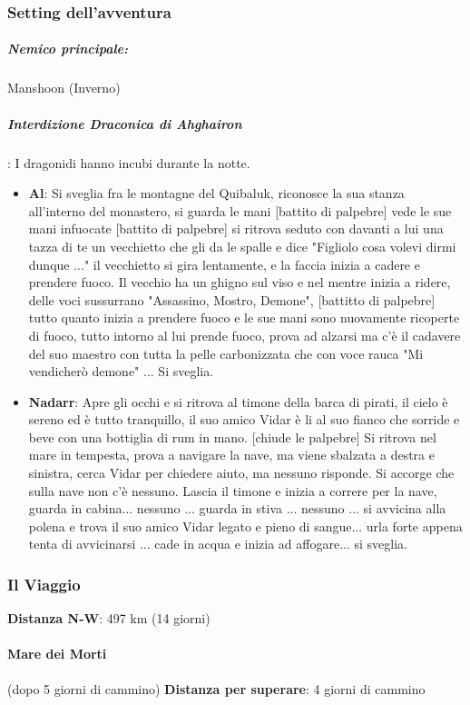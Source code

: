 \documentclass{article}
\begin{document}
\subsubsection{Setting dell'avventura}
\subparagraph{Nemico principale: } Manshoon (Inverno)
\subparagraph{Interdizione Draconica di Ahghairon}: I dragonidi hanno incubi durante la notte. 
\begin{itemize}
    \item \textbf{Al}: Si sveglia fra le montagne del Quibaluk, riconosce la sua stanza all'interno del monastero, si guarda le mani [battito di palpebre] vede le sue mani infuocate [battito di palpebre] si ritrova seduto con davanti a lui una tazza di te un vecchietto che gli da le spalle e dice "Figliolo cosa volevi dirmi dunque ..." il vecchietto si gira lentamente, e la faccia inizia a cadere e prendere fuoco. Il vecchio ha un ghigno sul viso e nel mentre inizia a ridere, delle voci sussurrano "Assassino, Mostro, Demone", [battitto di palpebre] tutto quanto inizia a prendere fuoco e le sue mani sono nuovamente ricoperte di fuoco, tutto intorno al lui prende fuoco, prova ad alzarsi ma c'è il cadavere del suo maestro con tutta la pelle carbonizzata che con voce rauca "Mi vendicherò demone" ... Si sveglia.
    \item \textbf{Nadarr}: Apre gli occhi e si ritrova al timone della barca di pirati, il cielo è sereno ed è tutto tranquillo, il suo amico Vidar è li al suo fianco che sorride e beve con una bottiglia di rum in mano. [chiude le palpebre] Si ritrova nel mare in tempesta, prova a navigare la nave, ma viene sbalzata a destra e sinistra, cerca Vidar per chiedere aiuto, ma nessuno risponde. Si accorge che sulla nave non c'è nessuno. Lascia il timone e inizia a correre per la nave, guarda in cabina... nessuno ... guarda in stiva ... nessuno ... si avvicina alla polena e trova il suo amico Vidar legato e pieno di sangue... urla forte appena tenta di avvicinarsi ... cade in acqua e inizia ad affogare... si sveglia. 
\end{itemize}

\subsubsection{Il Viaggio}
\textbf{Distanza N-W}: 497 km (14 giorni) 

\paragraph{Mare dei Morti} (dopo 5 giorni di cammino) 
\textbf{Distanza per superare}: 4 giorni di cammino
\end{document}
